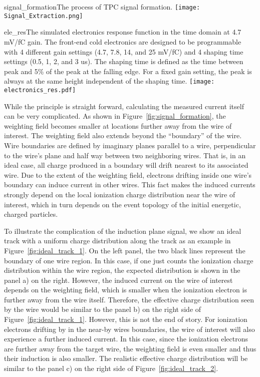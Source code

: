 \begin{cdrfigure}{signal_formation}{The process of TPC signal formation.}
\texttt{[image: Signal\_Extraction.png]}
\end{cdrfigure}

\begin{cdrfigure}{ele_res}{The simulated electronics response function in the time 
domain at 4.7 mV/fC gain. The front-end cold electronics are designed to be 
programmable with 4 different gain settings (4.7, 7.8, 14, and 25 mV/fC) and 
4 shaping time settings (0.5, 1, 2, and 3 us). The shaping time is defined as the time 
between peak and 5\% of the peak at the falling edge. For a fixed gain setting, 
the peak is always at the same height independent of the shaping time. }
\texttt{[image: electronics\_res.pdf]}
\end{cdrfigure}


While the principle is straight forward, calculating the measured
current itself can be very complicated. As shown in
Figure~\ref{fig:signal_formation}, the weighting field becomes smaller
at locations further away from the wire of interest.  
The weighting field also extends beyond the ``boundary'' of the wire.
Wire boundaries are defined by imaginary planes parallel to a wire,
perpendicular to the wire's plane and half way between two neighboring
wires.  That is, in an ideal case, all charge produced in a boundary
will drift nearest to its associated wire.
Due to the extent of the weighting field, electrons drifting inside
one wire's boundary can induce current in other wires.  This fact
makes the induced currents strongly depend on the local ionization
charge distribution near the wire of interest, which in turn depends
on the event topology of the initial energetic, charged particles.


To illustrate the complication of the induction plane signal, we show 
an ideal track with a uniform charge distribution along the track as 
an example in Figure~\ref{fig:ideal_track_1}. On the left panel, the 
two black lines represent the boundary of one wire region. In this case,  
if one just counts the ionization charge distribution within the wire region, the expected 
distribution is shown in the panel a) on the right.  However, the induced current on the wire of 
interest depends on the weighting field, which is smaller when the ionization electron is 
further away from the wire itself. Therefore, the effective charge distribution seen by 
the wire would be similar to the panel b) on the right side of 
Figure~\ref{fig:ideal_track_1}. However, this is not the end of story. For ionization electrons 
drifting by in the near-by wires boundaries, the wire of interest will also experience a 
further induced current. In this case, since the ionization electrons are further away 
from the target wire, the weighting field is even smaller and thus their induction is 
also smaller. The realistic effective charge distribution will be similar to the panel c) on 
the right side of Figure~\ref{fig:ideal_track_2}. 

